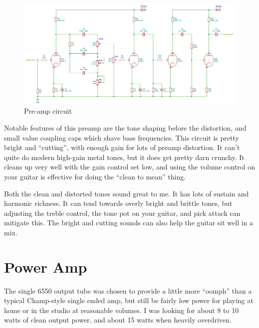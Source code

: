 \documentclass[pdftex,letterpaper,11pt]{article}
\begin{document}
\begin{figure}[H]
\centering
\caption{Pre-amp circuit}
\includegraphics[width=\textwidth]{preamp_circuit.png}
\end{figure}

Notable features of this preamp are the tone shaping before the distortion, and small value coupling caps which shave bass frequencies. This circuit is pretty bright and ``cutting'', with enough gain for lots of preamp distortion. It can't quite do modern high-gain metal tones, but it does get pretty darn crunchy. It cleans up very well with the gain control set low, and using the volume control on your guitar is effective for doing the ``clean to mean'' thing. 

Both the clean and distorted tones sound great to me. It has lots of sustain and harmonic richness. It can tend towards overly bright and brittle tones, but adjusting the treble control, the tone pot on your guitar, and pick attack can mitigate this. The bright and cutting sounds can also help the guitar sit well in a mix.

\section{Power Amp}

The single 6550 output tube was chosen to provide a little more ``oomph'' than a typical Champ-style single ended amp, but still be fairly low power for playing at home or in the studio at reasonable volumes. I was looking for about 8 to 10 watts of clean output power, and about 15 watts when heavily overdriven.
\end{document}
